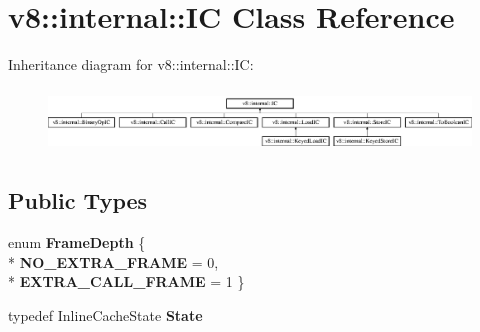 \hypertarget{classv8_1_1internal_1_1_i_c}{}\section{v8\+:\+:internal\+:\+:IC Class Reference}
\label{classv8_1_1internal_1_1_i_c}
Inheritance diagram for v8\+:\+:internal\+:\+:IC\+:\begin{figure}[H]
\begin{center}
\leavevmode
\includegraphics[height=1.686747cm]{classv8_1_1internal_1_1_i_c}
\end{center}
\end{figure}
\subsection*{Public Types}
\begin{DoxyCompactItemize}
\item 
enum {\bfseries Frame\+Depth} \{ \\*
{\bfseries N\+O\+\_\+\+E\+X\+T\+R\+A\+\_\+\+F\+R\+A\+ME} = 0, 
\\*
{\bfseries E\+X\+T\+R\+A\+\_\+\+C\+A\+L\+L\+\_\+\+F\+R\+A\+ME} = 1
 \}\hypertarget{classv8_1_1internal_1_1_i_c_aca6faa5726bfdbe4606466cc5ca2e0f7}{}\label{classv8_1_1internal_1_1_i_c_aca6faa5726bfdbe4606466cc5ca2e0f7}

\item 
typedef Inline\+Cache\+State {\bfseries State}\hypertarget{classv8_1_1internal_1_1_i_c_ad746d8b0ce82eec3a86b4744ca50798a}{}\label{classv8_1_1internal_1_1_i_c_ad746d8b0ce82eec3a86b4744ca50798a}

\end{DoxyCompactItemize}
